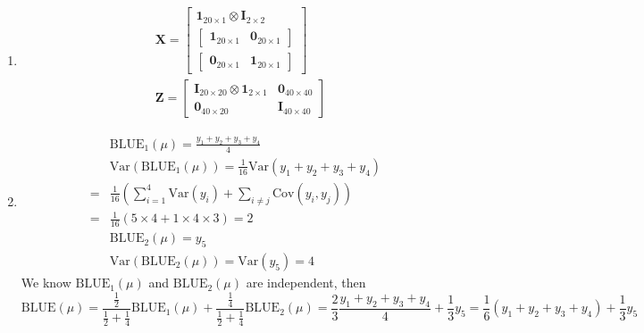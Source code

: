 \documentclass{article}
\begin{document}
\begin{enumerate}[leftmargin = 0 em, label = \arabic*., font = \bfseries]
			  \item 
			  \begin{align*}
			  & \bm X = \begin{bmatrix}
			  	\bm 1_{20 \times 1} \otimes \bm I_{2\times 2}\\
			  	\begin{bmatrix}
			  		\bm 1_{20 \times 1} & \bm 0_{20 \times 1}
			  	\end{bmatrix}\\
			  	\begin{bmatrix}
			  		\bm 0_{20 \times 1} & \bm 1_{20 \times 1}
			  	\end{bmatrix}
			  \end{bmatrix}\\
			  & \bm Z = \begin{bmatrix}
			  	\bm I_{20\times 20} \otimes \bm 1_{2\times 1} & \bm 0_{40\times 40}\\
			  	\bm 0_{40\times 20} & \bm I_{40\times 40}
			  \end{bmatrix}
			  \end{align*}

			  \item 
			  \begin{align*}
			  & \mathrm{BLUE}_1 (\mu) = \frac{y_1 + y_2 + y_3 + y_4}{4}\\
			  & \mathrm{Var}(\mathrm{BLUE}_1(\mu)) = \frac{1}{16} \mathrm{Var}(y_1 + y_2 + y_3 + y_4)\\
			  = & \frac{1}{16} \left(\sum_{i=1}^4 \mathrm{Var}(y_i) + \sum_{i \neq j} \mathrm{Cov}(y_i, y_j)\right)\\
			  =& \frac{1}{16}(5 \times 4 + 1 \times 4 \times 3) = 2 \\
			  & \mathrm{BLUE}_2(\mu) = y_5 \\
			  & \mathrm{Var}(\mathrm{BLUE}_2(\mu)) = \mathrm{Var}(y_5) = 4 
			  \end{align*}
			  We know $\mathrm{BLUE}_1(\mu)$ and $\mathrm{BLUE}_2 (\mu)$ are independent, then 
			  \[\mathrm{BLUE}(\mu) = \frac{\frac{1}{2}}{\frac{1}{2} + \frac{1}{4}} \mathrm{BLUE}_1(\mu) + \frac{\frac{1}{4}}{\frac{1}{2} + \frac{1}{4}} \mathrm{BLUE}_2 (\mu) = \frac{2}{3} \frac{y_1 + y_2 + y_3 + y_4}{4} + \frac{1}{3} y_5 = \frac{1}{6} (y_1 + y_2 + y_3 + y_4) + \frac{1}{3} y_5\]
			  
			  
			  
			   
	      \end{enumerate}
	      
\end{document}
